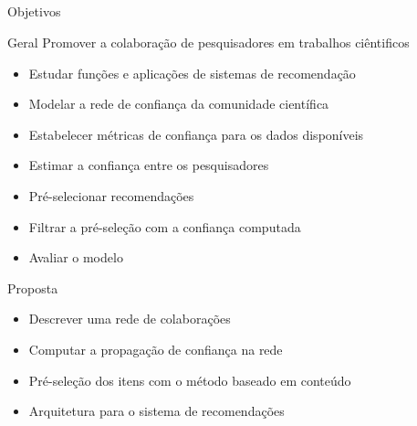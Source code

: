 \documentclass{beamer}
\begin{document}
\subsection[Objetivos]{}

\begin{frame}{Objetivos}{}

  \begin{block}{Geral}
    Promover a colaboração de pesquisadores em trabalhos ciêntificos
  \end{block}

  \begin{itemize}
    \item Estudar funções e aplicações de sistemas de recomendação
    \item Modelar a rede de confiança da comunidade científica
    \item Estabelecer métricas de confiança para os dados disponíveis
    \item Estimar a confiança entre os pesquisadores 
    \item Pré-selecionar recomendações
    \item Filtrar a pré-seleção com a confiança computada
    \item Avaliar o modelo
  \end{itemize}

\end{frame}

\begin{frame}{Proposta}{}

  \begin{itemize}
    \item Descrever uma rede de colaborações
    \item Computar a propagação de confiança na rede 
    \item Pré-seleção dos itens com o método baseado em conteúdo
    \item Arquitetura para o sistema de recomendações
  \end{itemize}

\end{frame}

\subsection[Revisão Bibliográfica]{}
\end{document}
